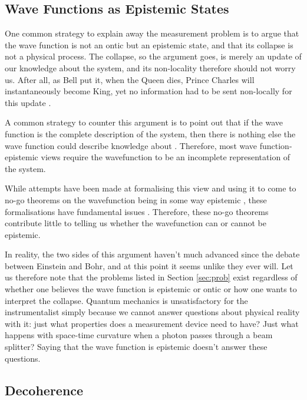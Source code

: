 \documentclass[superscriptaddress,floatfix,nofootinbib,12pt]{revtex4-2}
\begin{document}
 \subsection{Wave Functions as Epistemic States}
 \label{ssec:epis}

One common strategy to explain away the measurement problem is to argue that the wave function is not an ontic but an epistemic state, and that its collapse is not a physical process. The collapse, so the argument goes, is merely an update of our knowledge about the system, and its non-locality therefore should not worry us. After all, as Bell put it, when the Queen dies, Prince Charles will instantaneously become King, yet no information had to be sent non-locally for this update \cite{bell2004lanouvellecuisine}. 

A common strategy to counter this argument is to point out that if the wave function is the complete description of the system, then there is nothing else the wave function could describe knowledge about \cite{Maudlin1995ThreeMP}. Therefore, most wave function-epistemic views require the wavefunction to be an incomplete representation of the system.

While attempts have been made at formalising this view \cite{Spekkens2007EpistTot,Harrigan2010OMF} and using it to come to no-go theorems on the wavefunction being in some way epistemic \cite{Pusey2012Reality,Patra2013NoGo,Ruebeck2020Epistemic}, these formalisations have fundamental issues \cite{Schlosshauer2012Implications,Oldofredi2020Classification,Hance2021Wavefunctions}. Therefore, these no-go theorems contribute little to telling us whether the wavefunction can or cannot be epistemic.

In reality, the two sides of this argument haven't much advanced since the debate between Einstein and Bohr, and at this point it seems unlike they ever will. Let us therefore note that the problems listed in Section \ref{sec:prob} exist regardless of whether one believes the wave function is epistemic or ontic or how one wants to interpret the collapse. Quantum mechanics is unsatisfactory for the instrumentalist simply because we cannot answer questions about physical reality with it: just what properties does a measurement device need to have? Just what happens with space-time curvature when a photon passes through a beam splitter? Saying that the wave function is epistemic doesn't answer these questions. 

\subsection{Decoherence}
\label{ssec:dec}
\end{document}
